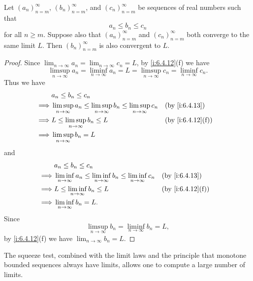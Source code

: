 \begin{cor}\label{i:6.4.14}
  Let \((a_n)_{n = m}^\infty\), \((b_n)_{n = m}^\infty\), and \((c_n)_{n = m}^\infty\) be sequences of real numbers such that
  \[
    a_n \leq b_n \leq c_n
  \]
  for all \(n \geq m\).
  Suppose also that \((a_n)_{n = m}^\infty\) and \((c_n)_{n = m}^\infty\) both converge to the same limit \(L\).
  Then \((b_n)_{n = m}^\infty\) is also convergent to \(L\).
\end{cor}

\begin{proof}
  Since \(\lim_{n \to \infty} a_n = \lim_{n \to \infty} c_n = L\), by \cref{i:6.4.12}(f) we have
  \[
    \limsup_{n \to \infty} a_n = \liminf_{n \to \infty} a_n = L = \limsup_{n \to \infty} c_n = \liminf_{n \to \infty} c_n.
  \]
  Thus we have
  \begin{align*}
             & a_n \leq b_n \leq c_n                                                                                            \\
    \implies & \limsup_{n \to \infty} a_n \leq \limsup_{n \to \infty} b_n \leq \limsup_{n \to \infty} c_n &  & \by{i:6.4.13}    \\
    \implies & L \leq \limsup_{n \to \infty} b_n \leq L                                                   &  & \by{i:6.4.12}[f] \\
    \implies & \limsup_{n \to \infty} b_n = L
  \end{align*}
  and
  \begin{align*}
             & a_n \leq b_n \leq c_n                                                                                            \\
    \implies & \liminf_{n \to \infty} a_n \leq \liminf_{n \to \infty} b_n \leq \liminf_{n \to \infty} c_n &  & \by{i:6.4.13}    \\
    \implies & L \leq \liminf_{n \to \infty} b_n \leq L                                                   &  & \by{i:6.4.12}[f] \\
    \implies & \liminf_{n \to \infty} b_n = L.
  \end{align*}
  Since
  \[
    \limsup_{n \to \infty} b_n = \liminf_{n \to \infty} b_n = L,
  \]
  by \cref{i:6.4.12}(f) we have \(\lim_{n \to \infty} b_n = L\).
\end{proof}

\setcounter{thm}{15}
\begin{rmk}\label{i:6.4.16}
  The squeeze test, combined with the limit laws and the principle that monotone bounded sequences always have limits, allows one to compute a large number of limits.
\end{rmk}

